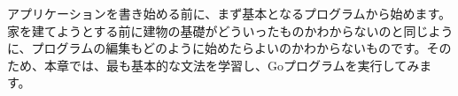 アプリケーションを書き始める前に、まず基本となるプログラムから始めます。家を建てようとする前に建物の基礎がどういったものかわからないのと同じように、プログラムの編集もどのように始めたらよいのかわからないものです。そのため、本章では、最も基本的な文法を学習し、Goプログラムを実行してみます。

